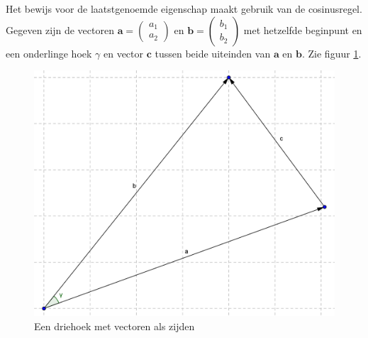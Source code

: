 \documentclass[12pt,a4paper]{article}
\begin{document}
	Het bewijs voor de laatstgenoemde eigenschap maakt gebruik van de cosinusregel. Gegeven zijn de vectoren $\mathbf{a}=\begin{pmatrix} a_1 \\ a_2 \end{pmatrix}$ en $\mathbf{b}=\begin{pmatrix} b_1 \\ b_2 \end{pmatrix}$ met hetzelfde beginpunt en een onderlinge hoek $\gamma$ en vector $\mathbf{c}$ tussen beide uiteinden van $\mathbf{a}$ en $\mathbf{b}$. Zie figuur \ref{cosinusregel-inproduct}.
	
	\begin{figure}[h]
		\centerline{\includegraphics[width=\textwidth]{Plaatjes/cosinusregel-inproduct.png}}
		\caption{Een driehoek met vectoren als zijden}
		\label{cosinusregel-inproduct}
	\end{figure}
	
\end{document}

